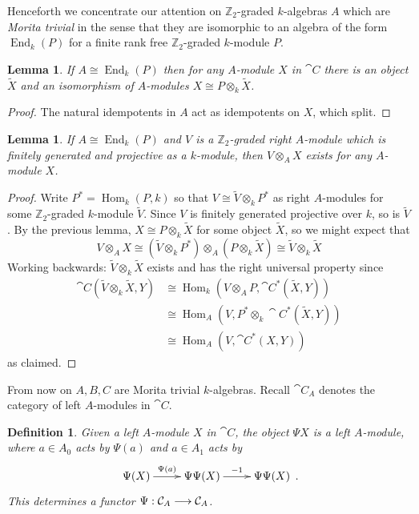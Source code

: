 \documentclass[english,letter paper,12pt,leqno]{article}
\newtheorem{lemma}[theorem]{Lemma}
\theoremstyle{example}
\newtheorem{definition}[theorem]{Definition}
\numberwithin{equation}{section}
\def\Hom{\operatorname{Hom}}
\DeclareMathOperator{\End}{End}
\begin{document}
Henceforth we concentrate our attention on $\mathbb{Z}_2$-graded $k$-algebras $A$ which are \emph{Morita trivial} in the sense that they are isomorphic to an algebra of the form $\End_k(P)$ for a finite rank free $\mathbb{Z}_2$-graded $k$-module $P$.

\begin{lemma} If $A \cong \End_k(P)$ then for any $A$-module $X$ in $\cat{C}$ there is an object $\widetilde{X}$ and an isomorphism of $A$-modules $X \cong P \otimes_k \widetilde{X}$.
\end{lemma}
\begin{proof}
The natural idempotents in $A$ act as idempotents on $X$, which split.
\end{proof}

\begin{lemma} If $A \cong \End_k(P)$ and $V$ is a $\mathbb{Z}_2$-graded right $A$-module which is finitely generated and projective as a $k$-module, then $V \otimes_A X$ exists for any $A$-module $X$.
\end{lemma}
\begin{proof}
Write $P^* = \Hom_k(P,k)$ so that $V \cong \widetilde{V} \otimes_k P^*$ as right $A$-modules for some $\mathbb{Z}_2$-graded $k$-module $\widetilde{V}$. Since $V$ is finitely generated projective over $k$, so is $\widetilde{V}$. By the previous lemma, $X \cong P \otimes_k \widetilde{X}$ for some object $\widetilde{X}$, so we might expect that
\[
V \otimes_A X \cong (\widetilde{V} \otimes_k P^*) \otimes_A (P \otimes_k \widetilde{X}) \cong \widetilde{V} \otimes_k \widetilde{X}
\]
Working backwards: $\widetilde{V} \otimes_k \widetilde{X}$ exists and has the right universal property since
\begin{align*}
\cat{C}(\widetilde{V} \otimes_k \widetilde{X}, Y) &\cong \Hom_k( V \otimes_A P, \cat{C}^*(\widetilde{X}, Y))\\
&\cong \Hom_A( V, P^* \otimes_k \cat{C}^*(\widetilde{X}, Y))\\
&\cong \Hom_A( V, \cat{C}^*( X, Y ) )
\end{align*}
as claimed.
\end{proof}

From now on $A,B,C$ are Morita trivial $k$-algebras. Recall $\cat{C}_A$ denotes the category of left $A$-modules in $\cat{C}$.

\begin{definition}\label{defn:psimodule} Given a left $A$-module $X$ in $\cat{C}$, the object $\Psi X$ is a left $A$-module, where $a \in A_0$ acts by $\Psi(a)$ and $a \in A_1$ acts by
\[
\xymatrix{
\Psi (X) \ar[r]^-{\Psi(a)} & \Psi \Psi (X) \ar[r]^-{-1} & \Psi \Psi (X)
}\,.
\]
This determines a functor $\Psi: \mathcal{C}_A \longrightarrow \mathcal{C}_A$.
\end{definition}
\end{document}
